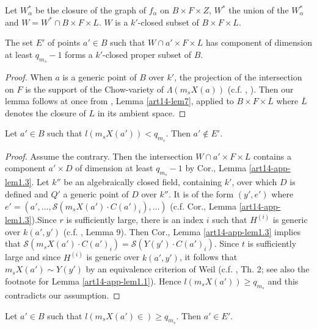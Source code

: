 Let $W^{*}_{\alpha}$ be the closure of the graph of $f_{\alpha}$ on $B\times F\times Z$, $W^{*}$ the union of the $W^{*}_{\alpha}$ and $W=W^{*}\cap B\times F\times L$. $W$ is a $k'$-closed subset of $B\times F\times L$.

\begin{sublemma}\label{art14-app-lem1.4}
The set $E'$ of points $a'\in B$ such that $W\cap a'\times F\times L$ has component of dimension at least $q_{m_{s}}-1$ forms a $k'$-closed proper subset of $B$.
\end{sublemma}

\begin{proof}
When $a$ is a generic point of $B$ over $k'$, the projection of the intersection on $F$ is the support of the Chow-variety of $\Lambda(m_{s}X(a))$ (c.f. \cite{art14-key14}, \cite{art14-key26}). Then our lemma follows at once from \cite{art14-key27}, Lemma \ref{art14-lem7}, applied to $B\times F\times \overline{L}$ where $\overline{L}$ denotes the closure of $L$ in its ambient space.
\end{proof}

\begin{sublemma}\label{art14-app-lem1.5}
Let $a'\in B$ such that $l(m_{s}X(a'))<q_{m_{s}}$. Then $a'\not\in E'$.
\end{sublemma}

\begin{proof}
Assume the contrary. Then the intersection $W\cap a'\times F\times L$ contains a component $a'\times D$ of dimension at least $q_{m_{s}}-1$ by Cor., Lemma \ref{art14-app-lem1.3}. Let $k''$ be an algebraically closed field, containing $k'$, over which $D$ is defined and $Q'$ a generic point of $D$ over $k''$. It is of the form $(y',e')$ where $e'=(a',\ldots,\mathscr{S}(m_{s}X(a')\cdot C(a')_{i}),\ldots)$ (c.f. Cor., Lemma \ref{art14-app-lem1.3}).\pageoriginale Since $r$ is sufficiently large, there is an index $i$ such that $H^{(i)}$ is generic over $k(a',y')$ (c.f. \cite{art14-key26}, Lemma 9). Then Cor., Lemma \ref{art14-app-lem1.3} implies that $\mathscr{S}(m_{s}X(a')\cdot C(a')_{i})=\mathscr{S}(Y(y')\cdot C(a')_{i})$. Since $t$ is sufficiently large and since $H^{(i)}$ is generic over $k(a',y')$, it follows that $m_{s}X(a')\sim Y(y')$ by an equivalence criterion of Weil (c.f. \cite{art14-key27}, Th. 2; see also the footnote for Lemma \ref{art14-app-lem1.1}). Hence $l(m_{s}X(a'))\geq q_{m_{s}}$ and this contradicts our assumption.
\end{proof}

\begin{sublemma}\label{art14-app-lem1.6}
Let $a'\in B$ such that $l(m_{s}X(a')\in)\geq q_{m_{s}}$. Then $a'\in E'$.
\end{sublemma}

